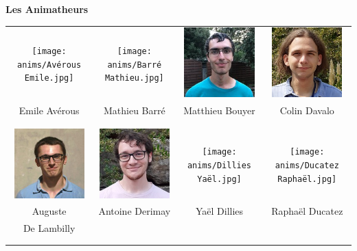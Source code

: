 \begin{center}
{\Huge\textbf{Les Animatheurs}}
\end{center}

\vfill
\vspace{2mm}
\begin{center}
\begin{tabular}{cccc}
\texttt{[image: anims/Avérous Emile.jpg]} &
\texttt{[image: anims/Barré Mathieu.jpg]} &
\includegraphics[angle=0,origin=c, width=27mm]{anims/Bouyer Matthieu.jpg} &
\includegraphics[angle=0,origin=c, width=27mm]{anims/Davalo Colin.jpg} \\
Emile Avérous & Mathieu Barré & Matthieu Bouyer & Colin Davalo \\ \\ \\

\includegraphics[angle=0,origin=c, width=27mm]{anims/De Lambilly Auguste.JPG} &
\includegraphics[angle=0,origin=c, width=27mm]{anims/Derimay Antoine.jpg} &
\texttt{[image: anims/Dillies Yaël.jpg]} &
\texttt{[image: anims/Ducatez Raphaël.jpg]} \\
Auguste & Antoine Derimay & Yaël Dillies & Raphaël Ducatez \\ De Lambilly & & & \\ \\ \\


\end{tabular}
\end{center}
